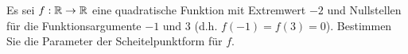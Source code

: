 \documentclass[12pt]{article}
\begin{document}
\begin{exercise}
Es sei $f: \mathbb{R} \rightarrow \mathbb{R}$ eine quadratische Funktion mit Extremwert $-2$ und Nullstellen für die Funktionsargumente $-1$ und $3$ (d.h. $f(-1) = f(3) = 0$). Bestimmen Sie die Parameter der Scheitelpunktform für $f$.
\end{exercise}

%
%
\newpage
\end{document}

